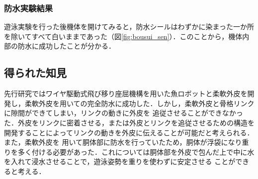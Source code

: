 \subsubsection{防水実験結果}
遊泳実験を行った後機体を開けてみると，防水シールはわずかに染まった一か所を除いてすべて白いままであった（図\ref{fig:bousui_sen}）．このことから，機体内部の防水に成功したことが分かる．

\subsection{得られた知見}
先行研究ではワイヤ駆動式飛び移り座屈機構を用いた魚ロボットと柔軟外皮を開発し，柔軟外皮を用いての完全防水に成功した．しかし，柔軟外皮と骨格リンクに隙間ができてしまい，リンクの動きに外皮を
追従させることができなかった．外皮をリンクに密着させる，または外皮とリンクを追従させるための構造を開発することによってリンクの動きを外皮に伝えることが可能だと考えられる．また，柔軟外皮を
用いて胴体部に防水を行っていたため，胴体が浮袋になり重りを多く付ける必要があった．これについては胴体部を外皮で包んだ上で中に水を入れて浸水させることで，遊泳姿勢を重りを使わずに安定させる
ことができると考える．